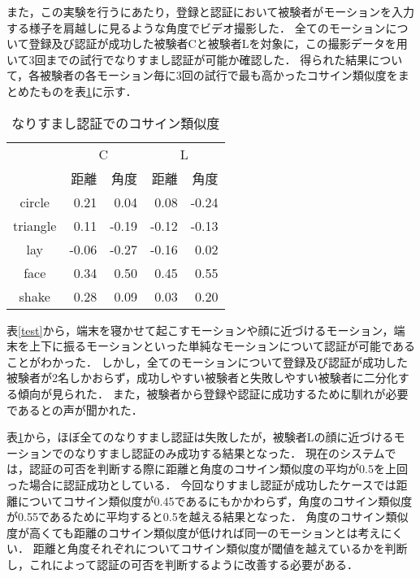 また，この実験を行うにあたり，登録と認証において被験者がモーションを入力する様子を肩越しに見るような角度でビデオ撮影した．
全てのモーションについて登録及び認証が成功した被験者Cと被験者Lを対象に，この撮影データを用いて3回までの試行でなりすまし認証が可能か確認した．
得られた結果について，各被験者の各モーション毎に3回の試行で最も高かったコサイン類似度をまとめたものを表\ref{spoof}に示す．

\begin{table}[htbp]
    \centering
    \caption{なりすまし認証でのコサイン類似度}
    \begin{tabular}{|c|r|r|r|r|} \hline
        & \multicolumn{2}{|c|}{C} & \multicolumn{2}{|c|}{L} \\
        & 距離 & 角度 & 距離 & 角度 \\ \hline
        circle & 0.21 & 0.04 & 0.08 & -0.24 \\ \hline
        triangle & 0.11 & -0.19 & -0.12 & -0.13 \\ \hline
        lay & -0.06 & -0.27 & -0.16 & 0.02 \\ \hline
        face & 0.34 & 0.50 & 0.45 & 0.55 \\ \hline
        shake & 0.28 & 0.09 & 0.03 & 0.20 \\ \hline
    \end{tabular}
    \label{spoof}
\end{table}

表\ref{test}から，端末を寝かせて起こすモーションや顔に近づけるモーション，端末を上下に振るモーションといった単純なモーションについて認証が可能であることがわかった．
しかし，全てのモーションについて登録及び認証が成功した被験者が2名しかおらず，成功しやすい被験者と失敗しやすい被験者に二分化する傾向が見られた．
また，被験者から登録や認証に成功するために馴れが必要であるとの声が聞かれた．

表\ref{spoof}から，ほぼ全てのなりすまし認証は失敗したが，被験者Lの顔に近づけるモーションでのなりすまし認証のみ成功する結果となった．
現在のシステムでは，認証の可否を判断する際に距離と角度のコサイン類似度の平均が0.5を上回った場合に認証成功としている．
今回なりすまし認証が成功したケースでは距離についてコサイン類似度が0.45であるにもかかわらず，角度のコサイン類似度が0.55であるために平均すると0.5を越える結果となった．
角度のコサイン類似度が高くても距離のコサイン類似度が低ければ同一のモーションとは考えにくい．
距離と角度それぞれについてコサイン類似度が閾値を越えているかを判断し，これによって認証の可否を判断するように改善する必要がある．

